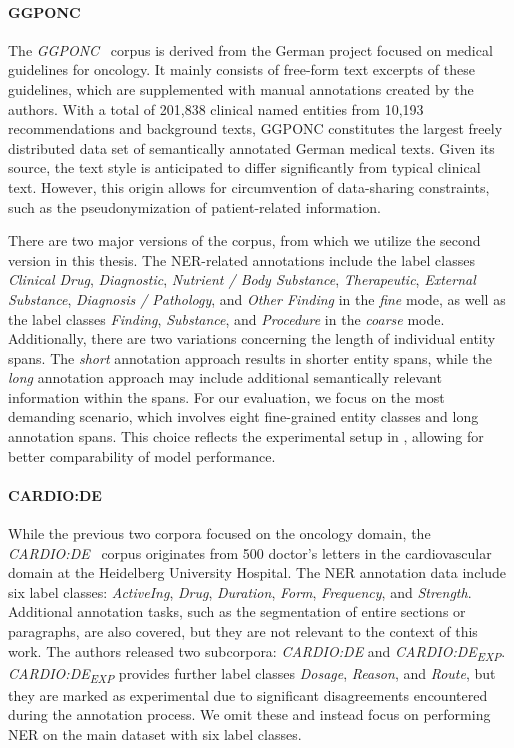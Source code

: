 \paragraph{GGPONC}
The \textit{GGPONC}~\cite{borchert2022ggponc} corpus is derived from the German
project focused on medical guidelines for oncology. It mainly consists of
free-form text excerpts of these guidelines, which are supplemented with manual
annotations created by the authors. With a total of 201,838 clinical named
entities from 10,193 recommendations and background texts, GGPONC constitutes
the largest freely distributed data set of semantically annotated German medical
texts. Given its source, the text style is anticipated to differ significantly
from typical clinical text. However, this origin allows for circumvention of
data-sharing constraints, such as the pseudonymization of patient-related
information.

There are two major versions of the corpus, from which we utilize the second
version in this thesis. The NER-related annotations include the label classes
\textit{Clinical Drug}, \textit{Diagnostic}, \textit{Nutrient / Body Substance},
\textit{Therapeutic}, \textit{External Substance}, \textit{Diagnosis /
Pathology}, and \textit{Other Finding} in the \textit{fine} mode, as well as the
label classes \textit{Finding}, \textit{Substance}, and \textit{Procedure} in
the \textit{coarse} mode. Additionally, there are two variations concerning the
length of individual entity spans. The \textit{short} annotation approach
results in shorter entity spans, while the \textit{long} annotation approach may
include additional semantically relevant information within the spans. For our
evaluation, we focus on the most demanding scenario, which involves eight
fine-grained entity classes and long annotation spans. This choice reflects the
experimental setup in \cite{bressem2024medbert}, allowing for better
comparability of model performance.

\paragraph{CARDIO:DE}
While the previous two corpora focused on the oncology domain, the
\textit{CARDIO:DE}~\cite{cardiode} corpus originates from 500 doctor's letters
in the cardiovascular domain at the Heidelberg University Hospital. The NER
annotation data include six label classes: \textit{ActiveIng}, \textit{Drug},
\textit{Duration}, \textit{Form}, \textit{Frequency}, and \textit{Strength}.
Additional annotation tasks, such as the segmentation of entire sections or
paragraphs, are also covered, but they are not relevant to the context of this
work. The authors released two subcorpora: \textit{CARDIO:DE} and
\textit{CARDIO:DE\textsubscript{EXP}}. \textit{CARDIO:DE\textsubscript{EXP}}
provides further label classes  \textit{Dosage}, \textit{Reason}, and
\textit{Route}, but they are marked as experimental due to significant
disagreements encountered during the annotation process. We omit these and
instead focus on performing NER on the main dataset with six label classes.

